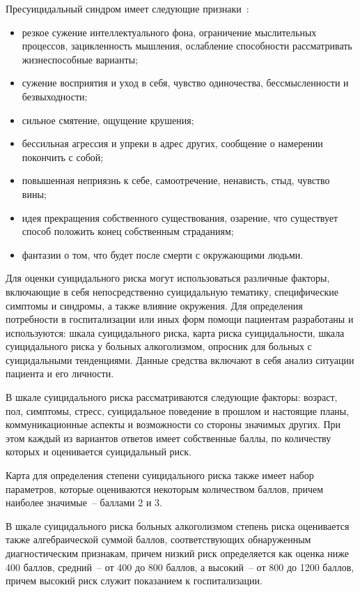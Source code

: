 Пресуицидальный синдром имеет следующие признаки~\cite{starsen}:
\begin{itemize}
	\item резкое сужение интеллектуального фона, ограничение мыслительных процессов, зацикленность мышления, ослабление способности рассматривать жизнеспособные варианты;
	\item сужение восприятия и уход в себя, чувство одиночества, бессмысленности и безвыходности;
	\item сильное смятение, ощущение крушения;
	\item бессильная агрессия и упреки в адрес других, сообщение о намерении покончить с собой;
	\item повышенная неприязнь к себе, самоотречение, ненависть, стыд, чувство вины;
	\item идея прекращения собственного существования, озарение, что существует способ положить конец собственным страданиям;
	\item фантазии о том, что будет после смерти с окружающими людьми.
\end{itemize}

Для оценки суицидального риска могут использоваться различные факторы, включающие в себя непосредственно суицидальную тематику, специфические симптомы и синдромы, а также влияние окружения. Для определения потребности в госпитализации или иных форм помощи пациентам разработаны и используются: шкала суицидального риска, карта риска суицидальности, шкала суицидального риска у больных алкоголизмом, опросник для больных с суицидальными тенденциями. Данные средства включают в себя анализ ситуации пациента и его личности.~\cite{starsen}

В шкале суицидального риска рассматриваются следующие факторы: возраст, пол, симптомы, стресс, суицидальное поведение в прошлом и настоящие планы, коммуникационные аспекты и возможности со стороны значимых других. При этом каждый из вариантов ответов имеет собственные баллы, по количеству которых и оценивается суицидальный риск.~\cite{starsen} 

Карта для определения степени суицидального риска также имеет набор параметров, которые оцениваются некоторым количеством баллов, причем наиболее значимые~-- баллами 2 и 3.~\cite{starsen}

В шкале суицидального риска больных алкоголизмом степень риска оценивается также алгебраической суммой баллов, соответствующих обнаруженным диагностическим признакам, причем низкий риск определяется как оценка ниже 400 баллов, средний~-- от 400 до 800 баллов, а высокий~-- от 800 до 1200 баллов, причем высокий риск служит показанием к госпитализации.~\cite{starsen}

